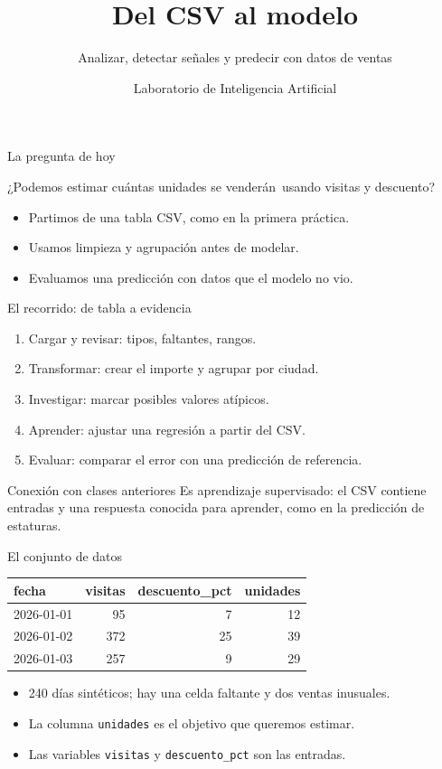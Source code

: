 \documentclass[aspectratio=169,11pt]{beamer}
\title{Del CSV al modelo}
\subtitle{Analizar, detectar señales y predecir con datos de ventas}
\author{Laboratorio de Inteligencia Artificial}
\date{}
\begin{document}
\begin{frame}
  \titlepage
\end{frame}

\begin{frame}{La pregunta de hoy}
  \begin{center}
    \Large ¿Podemos estimar cuántas unidades se venderán\
    usando visitas y descuento?
  \end{center}
  \vfill
  \begin{itemize}
    \item Partimos de una tabla CSV, como en la primera práctica.
    \item Usamos limpieza y agrupación antes de modelar.
    \item Evaluamos una predicción con datos que el modelo no vio.
  \end{itemize}
\end{frame}

\begin{frame}{El recorrido: de tabla a evidencia}
  \begin{enumerate}
    \item Cargar y revisar: tipos, faltantes, rangos.
    \item Transformar: crear el importe y agrupar por ciudad.
    \item Investigar: marcar posibles valores atípicos.
    \item Aprender: ajustar una regresión a partir del CSV.
    \item Evaluar: comparar el error con una predicción de referencia.
  \end{enumerate}
  \vfill
  \begin{block}{Conexión con clases anteriores}
    Es aprendizaje supervisado: el CSV contiene entradas y una respuesta conocida para aprender, como en la predicción de estaturas.
  \end{block}
\end{frame}

\begin{frame}{El conjunto de datos}
  \begin{center}
    \begin{tabular}{lrrr}
      \toprule
      fecha & visitas & descuento\_pct & unidades \\
      \midrule
      2026-01-01 & 95 & 7 & 12 \\
      2026-01-02 & 372 & 25 & 39 \\
      2026-01-03 & 257 & 9 & 29 \\
      \bottomrule
    \end{tabular}
  \end{center}
  \begin{itemize}
    \item 240 días sintéticos; hay una celda faltante y dos ventas inusuales.
    \item La columna \texttt{unidades} es el objetivo que queremos estimar.
    \item Las variables \texttt{visitas} y \texttt{descuento\_pct} son las entradas.
  \end{itemize}
\end{frame}
\end{document}
